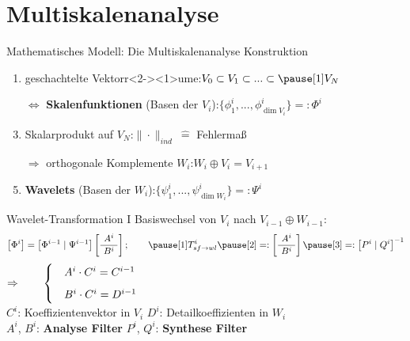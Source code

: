 \section[Multiskalenanalyse \hspace{42mm}\small am Beispiel der eindimensionalen Haar-Wavelets]{Multiskalenanalyse}
	
	\begin{frame}{Mathematisches Modell: Die Multiskalenanalyse}
		\alert{Konstruktion}
		\begin{enumerate}\pause
			\item geschachtelte \pause[1]Vektorr<2-><1>um\pause[2]e:\hspace{16.5mm}$V_0\subset V_1\subset ...\subset \pause[1]V_N$\vspace{2mm}\pause\pause
			\item[$\Leftrightarrow$\hspace{-0.3mm}] {\bf Skalenfunktionen} (Basen der $V_i$):\hspace{8mm}$\{\phi^i_1, ..., \phi^i_{\dim V_i}\}=:\Phi^i$\vspace{2mm}\pause
			\item Skalarprodukt auf $V_N$:\hspace{27.2mm}$\|\cdot\|_{ind}\ \widehat{=}$ Fehlermaß\vspace{2mm}\pause
			\item[$\Rightarrow$\hspace{-0.3mm}] orthogonale Komplemente $W_i$:\hspace{12mm}$W_i\oplus V_i=V_{i+1}$\vspace{2mm}\pause
			\item {\bf Wavelets} (Basen der $W_i$):\hspace{21.5mm}$\{\psi^i_1, ..., \psi^i_{\dim W_i}\}=:\Psi^i$
		\end{enumerate}
	\end{frame}

	\begin{frame}{Wavelet-Transformation I}
		\alert{Basiswechsel} von $V_{i}$ nach $V_{i-1}\oplus W_{i-1}$: \vspace{2mm}\pause[2]\[ \left[ \Phi^i\right] =\left[ \Phi^{i-1}\mid \Psi^{i-1}\right]\left[ \frac{\ A^i\ }{\ B^i\ }\right];\qquad \pause[1]T^i_{sf\rightarrow wl}\pause[2]=:\left[ \frac{\ A^i\ }{\ B^i\ }\right]\pause[3]=:\left[ P^i\mid Q^i\right]^{-1}\vspace{3mm}\]\pause[4]
		$\Rightarrow\qquad \begin{cases}
			&A^i\cdot C^i=C^{i-1}\vspace{2mm}\\
			&B^i\cdot C^i=D^{i-1}
		\end{cases}$\vspace{10mm}\\
		$C^i$: Koeffizientenvektor in $V_i$\hspace{8.8mm} $D^i$: Detailkoeffizienten in $W_i$\vspace{2mm}\\ \pause[3]
		$A^i$, $B^i$: {\bf Analyse Filter}\hspace{22mm} $P^i$, $Q^i$: {\bf Synthese Filter}
	\end{frame}

